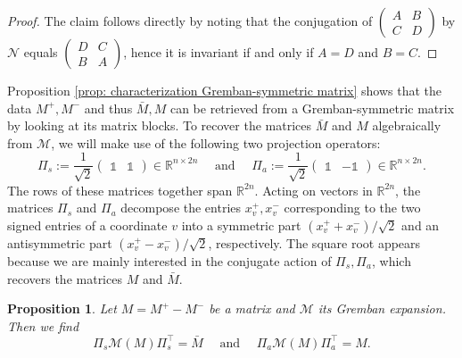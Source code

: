 \documentclass[reprint,onecolumn]{article}
\newtheorem{proposition}[theorem]{Proposition}
\newcommand{\R}{\mathbb{R}}
\newcommand{\C}{\mathbb{C}}
\newcommand{\1}{\mathbb{1}}
\newcommand{\0}{\mathbf{0}}
\begin{document}
\begin{proof}
The claim follows directly by noting that the conjugation of $\left(\begin{smallmatrix}A&B\\C&D\end{smallmatrix}\right)$ by $\mathcal{N}$ equals $\left(\begin{smallmatrix}D&C\\B&A\end{smallmatrix}\right)$, hence it is invariant if and only if $A=D$ and $B=C$.
\end{proof}
Proposition \ref{prop: characterization Gremban-symmetric matrix} shows that the data $M^+,M^-$ and thus $\bar{M},M$ can be retrieved from a Gremban-symmetric matrix by looking at its matrix blocks. To recover the matrices $\bar{M}$ and $M$ algebraically from $\mathcal{M}$, we will make use of the following two projection operators:
\begin{equation}\label{eq: projection matrices}
    \Pi_s := \frac{1}{\sqrt{2}}\begin{pmatrix}\1 & \1\end{pmatrix} \in\R^{n\times 2n}\quad\text{~and~}\quad \Pi_a := \frac{1}{\sqrt{2}}\begin{pmatrix}\1 & -\1\end{pmatrix} \in\R^{n\times 2n}.
\end{equation}
The rows of these matrices together span $\R^{2n}$. Acting on vectors in $\R^{2n}$, the matrices $\Pi_s$ and $\Pi_a$ decompose the entries ${x}_v^+,{x}_v^-$ corresponding to the two signed entries of a coordinate $v$ into a symmetric part $({x}_v^++{x}_v^-)/\sqrt{2}$ and an antisymmetric part $({x}_v^+-{x}_v^-)/\sqrt{2}$, respectively. The square root appears because we are mainly interested in the conjugate action of $\Pi_s,\Pi_a$, which recovers the matrices $M$ and $\bar{M}$.
\begin{proposition}\label{prop: algebraic projections}
Let $M=M^+-M^-$ be a matrix and $\mathcal{M}$ its Gremban expansion. Then we find
$$
\Pi_s\mathcal{M}(M)\Pi_s^\top = \bar{M} \quad\text{~and~}\quad \Pi_a\mathcal{M}(M)\Pi_a^\top = M.
$$
\end{proposition}
%
\end{document}
